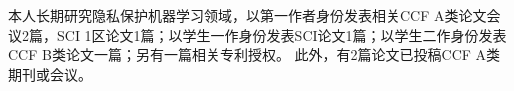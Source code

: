 本人长期研究隐私保护机器学习领域，以第一作者身份发表相关CCF A类论文会议2篇，SCI 1区论文1篇；以学生一作身份发表SCI论文1篇；以学生二作身份发表CCF B类论文一篇；另有一篇相关专利授权。
此外，有2篇论文已投稿CCF A类期刊或会议。